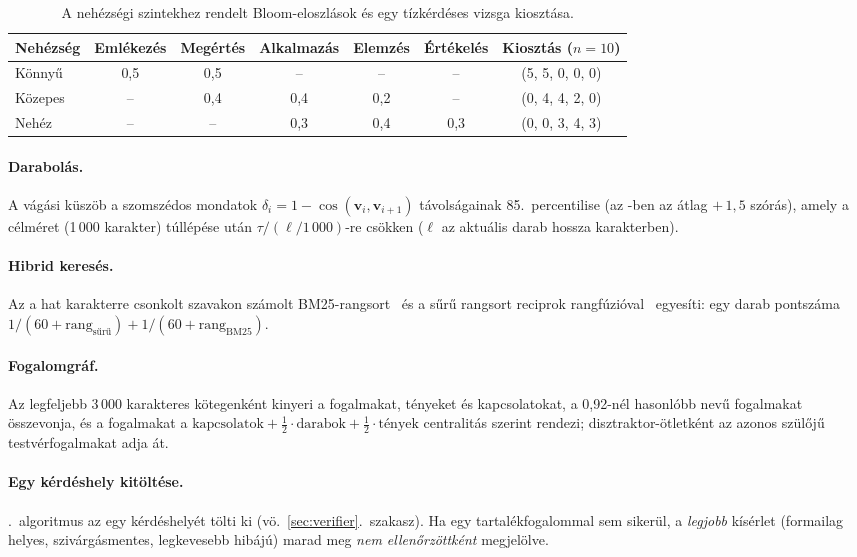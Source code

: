 \begin{table}[htbp]
\centering
\caption{A nehézségi szintekhez rendelt Bloom-eloszlások és egy tízkérdéses vizsga kiosztása.}
\label{tab:bloom}
\small
\begin{tabular}{@{}lccccc@{\qquad}c@{}}
\toprule
Nehézség & Emlékezés & Megértés & Alkalmazás & Elemzés & Értékelés & Kiosztás ($n=10$) \\
\midrule
Könnyű   & 0,5 & 0,5 & -- & -- & -- & (5, 5, 0, 0, 0) \\
Közepes  & -- & 0,4 & 0,4 & 0,2 & -- & (0, 4, 4, 2, 0) \\
Nehéz    & -- & -- & 0,3 & 0,4 & 0,3 & (0, 0, 3, 4, 3) \\
\bottomrule
\end{tabular}
\end{table}

\paragraph{Darabolás.}\label{app-darabolas} A vágási küszöb a szomszédos mondatok
$\delta_i=1-\cos(\mathbf{v}_i,\mathbf{v}_{i+1})$ távolságainak 85.~percentilise (az -ben az
átlag $+\,1{,}5$ szórás), amely a célméret (1\,000 karakter) túllépése után $\tau/(\ell/1\,000)$-re
csökken ($\ell$ az aktuális darab hossza karakterben).

\paragraph{Hibrid keresés.}\label{app-hibrid} Az  a hat karakterre csonkolt szavakon számolt
BM25-rangsort~\cite{robertson2009bm25} és a sűrű rangsort reciprok rangfúzióval~\cite{cormack2009rrf}
egyesíti: egy darab pontszáma $1/(60+\mathrm{rang}_{\text{sűrű}})+1/(60+\mathrm{rang}_{\text{BM25}})$.

\paragraph{Fogalomgráf.}\label{app-graf} Az  legfeljebb 3\,000 karakteres kötegenként kinyeri a
fogalmakat, tényeket és kapcsolatokat, a 0,92-nél hasonlóbb nevű fogalmakat összevonja, és a fogalmakat
a $\text{kapcsolatok}+\tfrac12\cdot\text{darabok}+\tfrac12\cdot\text{tények}$ centralitás szerint
rendezi; disztraktor-ötletként az azonos szülőjű testvérfogalmakat adja át.

\paragraph{Egy kérdéshely kitöltése.}\label{app-slot} \Az{\ref{alg:slot}}.~algoritmus az  egy
kérdéshelyét tölti ki (vö.\ \ref{sec:verifier}.~szakasz). Ha egy tartalékfogalommal sem sikerül, a
\emph{legjobb} kísérlet (formailag helyes, szivárgásmentes, legkevesebb hibájú) marad meg \emph{nem
ellenőrzöttként} megjelölve.

